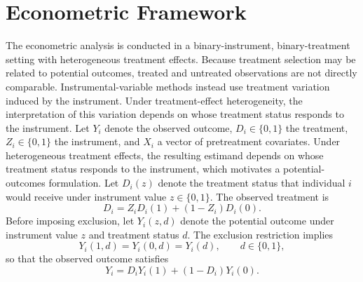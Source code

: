 \documentclass[12pt, a4paper, oneside]{article}
\theoremstyle{plain}
\theoremstyle{definition}
\begin{document}
 


\section{Econometric Framework}

The econometric analysis is conducted in a binary-instrument, binary-treatment setting with heterogeneous treatment effects. Because treatment selection may be related to potential outcomes, treated and untreated observations are not directly comparable. Instrumental-variable methods instead use treatment variation induced by the instrument. Under treatment-effect heterogeneity, the interpretation of this variation depends on whose treatment status responds to the instrument.
Let $Y_i$ denote the observed outcome, $D_i\in\{0,1\}$ the treatment,
$Z_i\in\{0,1\}$ the instrument, and $X_i$ a vector of pretreatment
covariates.
 Under heterogeneous treatment effects, the resulting estimand depends
on whose treatment status responds to the instrument, which motivates a
potential-outcomes formulation.
Let $D_i(z)$ denote the treatment status that individual $i$ would
receive under instrument value $z\in\{0,1\}$. The observed treatment is
\begin{equation}
    D_i = Z_iD_i(1) + (1-Z_i)D_i(0).
\end{equation}
Before imposing exclusion, let $Y_i(z,d)$ denote the potential outcome
under instrument value $z$ and treatment status $d$. The exclusion
restriction implies
\begin{equation}
    Y_i(1,d)=Y_i(0,d)=Y_i(d), \qquad d\in\{0,1\},
\end{equation}
so that the observed outcome satisfies
\begin{equation}
    Y_i = D_iY_i(1)+(1-D_i)Y_i(0).
\end{equation}
\end{document}

